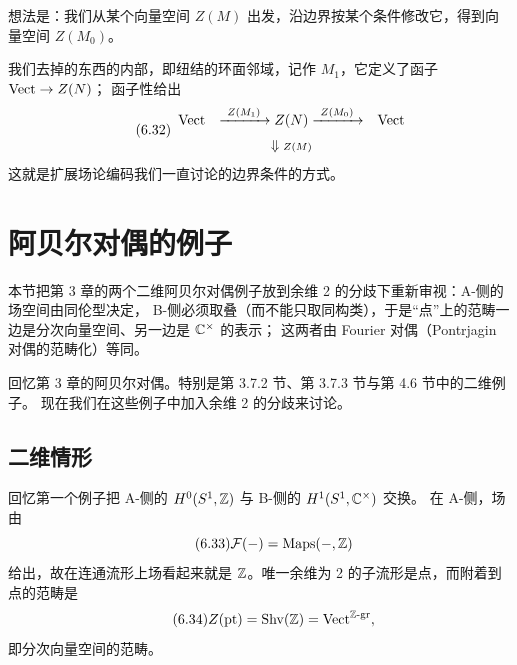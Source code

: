 
想法是：我们从某个向量空间 $Z(M)$ 出发，沿边界按某个条件修改它，得到向量空间 $Z(M_0)$。

我们去掉的东西的内部，即纽结的环面邻域，记作 $M_1$，它定义了函子 $\mathrm{Vect}\to Z(N)$；
函子性给出
\begin{equation}\tag{6.32}\label{eq:6.32}
\begin{array}{ccc}
\mathrm{Vect} & \xrightarrow{\ Z(M_1)\ } Z(N) \xrightarrow{\ Z(M_0)\ } & \mathrm{Vect}\\[6pt]
& \Downarrow{\scriptstyle Z(M)} &
\end{array}
\end{equation}
这就是扩展场论编码我们一直讨论的边界条件的方式。

\section{阿贝尔对偶的例子}

\begin{sectionkey}
本节把第 3 章的两个二维阿贝尔对偶例子放到余维 2 的分歧下重新审视：A-侧的场空间由同伦型决定，
B-侧必须取叠（而不能只取同构类），于是“点”上的范畴一边是分次向量空间、另一边是 $\mathbb{C}^\times$ 的表示；
这两者由 Fourier 对偶（Pontrjagin 对偶的范畴化）等同。
\end{sectionkey}

回忆第 3 章的阿贝尔对偶。特别是第 3.7.2 节、第 3.7.3 节与第 4.6 节中的二维例子。
现在我们在这些例子中加入余维 2 的分歧来讨论。

\subsection{二维情形}

回忆第一个例子把 A-侧的 $H^0(S^1,\mathbb{Z})$ 与 B-侧的 $H^1(S^1,\mathbb{C}^{\times})$ 交换。
在 A-侧，场由
\begin{equation}\tag{6.33}\label{eq:6.33}
\mathcal{F}(-)=\operatorname{Maps}(-,\mathbb{Z})
\end{equation}
给出，故在连通流形上场看起来就是 $\mathbb{Z}$。唯一余维为 2 的子流形是点，而附着到点的范畴是
\begin{equation}\tag{6.34}\label{eq:6.34}
Z(\mathrm{pt})=\mathrm{Shv}(\mathbb{Z})=\mathrm{Vect}^{\mathbb{Z}\text{-gr}},
\end{equation}
即分次向量空间的范畴。

